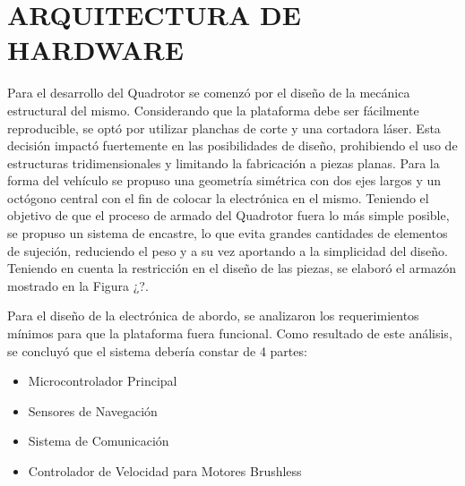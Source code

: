 \documentclass[conference]{IEEEtran}
\begin{document}
\section{ARQUITECTURA DE HARDWARE}
Para el desarrollo del Quadrotor se comenzó por el diseño de la mecánica estructural del mismo. Considerando que la plataforma debe ser fácilmente reproducible, se optó por utilizar planchas de corte y una cortadora láser. Esta decisión impactó fuertemente en las posibilidades de diseño, prohibiendo el uso de estructuras tridimensionales y limitando la fabricación a piezas planas. Para la forma del vehículo se propuso una geometría simétrica con dos ejes largos y un octógono central con el fin de colocar la electrónica en el mismo. Teniendo el objetivo de que el proceso de armado del Quadrotor fuera lo más simple posible, se propuso un sistema de encastre, lo que evita grandes cantidades de elementos de sujeción, reduciendo el peso y a su vez aportando a la simplicidad del diseño. Teniendo en cuenta la restricción en el diseño de las piezas, se elaboró el armazón mostrado en la Figura ¿?.

Para el diseño de la electrónica de abordo, se analizaron los requerimientos mínimos para que la plataforma fuera funcional. Como resultado de este análisis, se concluyó que el sistema debería constar de 4 partes: 
\begin{itemize}
\item Microcontrolador Principal
\item Sensores de Navegación 
\item Sistema de Comunicación
\item Controlador de Velocidad para Motores Brushless
\end{itemize}
	
\end{document}
